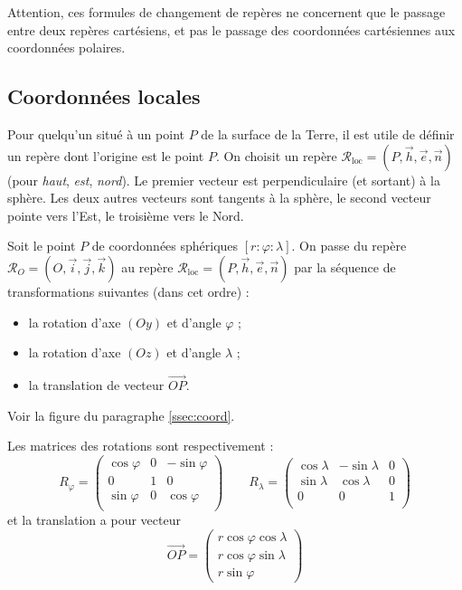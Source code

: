 \documentclass[class=report,crop=false]{standalone}
\newcommand{\vect}{\overrightarrow}
\begin{document}
\bigskip

Attention, ces formules de changement de repères ne concernent que 
le passage entre deux repères cartésiens, et pas le passage des coordonnées 
cartésiennes aux coordonnées polaires. 


\subsection{Coordonnées locales}

Pour quelqu'un situé à un point $P$ de la surface de la Terre, il est utile
de définir un repère dont l'origine est le point $P$. On choisit un repère
$\mathcal{R}_{\text{loc}} = (P,\vect{h},\vect{e},\vect{n})$ (pour \emph{haut}, \emph{est}, \emph{nord}).
Le premier vecteur est perpendiculaire (et sortant) à la sphère.
Les deux autres vecteurs sont tangents à la sphère, 
le second vecteur pointe vers l'Est, le troisième vers le Nord.




Soit le point $P$ de coordonnées sphériques $[r :\varphi :\lambda]$.
On passe du repère $\mathcal{R}_O = (O,\vect{i},\vect{j},\vect{k})$ au repère
$\mathcal{R}_{\text{loc}} = (P,\vect{h},\vect{e},\vect{n})$ par 
la séquence de transformations suivantes (dans cet ordre) :
\begin{itemize}
  \item la rotation d'axe $(Oy)$ et d'angle $\varphi$ ;
  \item la rotation d'axe $(Oz)$ et d'angle $\lambda$ ;
  \item la translation de vecteur $\vect{OP}$.
\end{itemize}

Voir la figure du paragraphe \ref{ssec:coord}.


Les matrices des rotations sont respectivement :
$$R_\varphi = 
\begin{pmatrix}
\cos \varphi & 0 & -\sin \varphi \\
0            & 1 & 0 \\
\sin \varphi & 0 & \cos \varphi \\
\end{pmatrix}
\qquad R_\lambda = 
\begin{pmatrix}
\cos \lambda & -\sin \lambda & 0 \\
\sin \lambda & \cos \lambda  & 0 \\
0            & 0             & 1 \\
\end{pmatrix}$$
et la translation a pour vecteur 
$$\vect{OP} = 
\begin{pmatrix}
r \cos \varphi \cos \lambda \\
r \cos \varphi \sin \lambda \\
r \sin \varphi  
\end{pmatrix}$$
\end{document}
